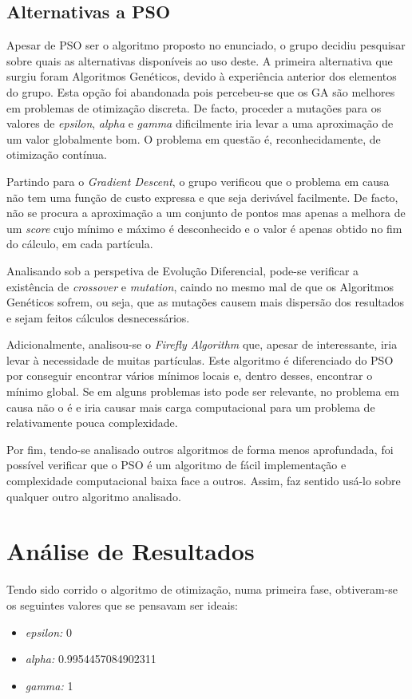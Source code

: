 \documentclass[runningheads]{article}
\begin{document}
\subsection{Alternativas a PSO}
Apesar de PSO ser o algoritmo proposto no enunciado, o grupo decidiu pesquisar sobre quais as alternativas disponíveis ao uso deste. A primeira alternativa que surgiu foram Algoritmos Genéticos, devido à experiência anterior dos elementos do grupo. Esta opção foi abandonada pois percebeu-se que os GA são melhores em problemas de otimização discreta. De facto, proceder a mutações para os valores de \textit{epsilon}, \textit{alpha} e \textit{gamma} dificilmente iria levar a uma aproximação de um valor globalmente bom. O problema em questão é, reconhecidamente, de otimização contínua.
\par Partindo para o \textit{Gradient Descent}, o grupo verificou que o problema em causa não tem uma função de custo expressa e que seja derivável facilmente. De facto, não se procura a aproximação a um conjunto de pontos mas apenas a melhora de um \textit{score} cujo mínimo e máximo é desconhecido e o valor é apenas obtido no fim do cálculo, em cada partícula.
\par Analisando sob a perspetiva de Evolução Diferencial, pode-se verificar a existência de \textit{crossover} e \textit{mutation}, caindo no mesmo mal de que os Algoritmos Genéticos sofrem, ou seja, que as mutações causem mais dispersão dos resultados e sejam feitos cálculos desnecessários.
\par Adicionalmente, analisou-se o \textit{Firefly Algorithm} que, apesar de interessante, iria levar à necessidade de muitas partículas. Este algoritmo é diferenciado do PSO por conseguir encontrar vários mínimos locais e, dentro desses, encontrar o mínimo global. Se em alguns problemas isto pode ser relevante, no problema em causa não o é e iria causar mais carga computacional para um problema de relativamente pouca complexidade.
\par Por fim, tendo-se analisado outros algoritmos de forma menos aprofundada, foi possível verificar que o PSO é um algoritmo de fácil implementação e complexidade computacional baixa face a outros. Assim, faz sentido usá-lo sobre qualquer outro algoritmo analisado.

\newpage
\section{Análise de Resultados}
\label{AR}
Tendo sido corrido o algoritmo de otimização, numa primeira fase, obtiveram-se os seguintes valores que se pensavam ser ideais:
\begin{itemize}
    \item \textit{epsilon:} 0
    \item \textit{alpha:} 0.9954457084902311
    \item \textit{gamma:} 1
\end{itemize}
\end{document}
